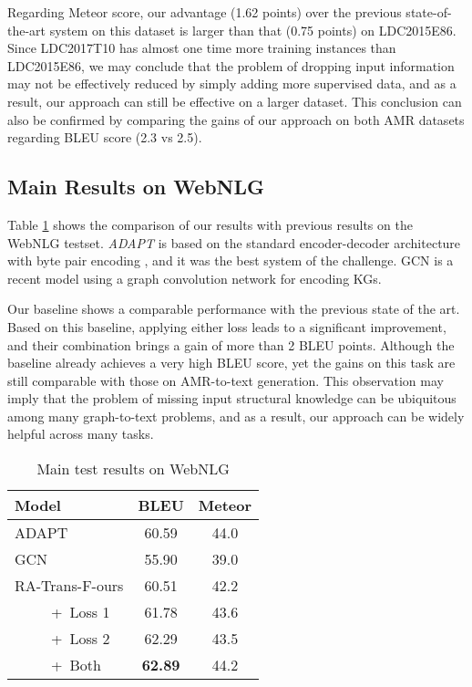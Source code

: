 \documentclass[11pt,a4paper]{article}
\begin{document}
Regarding Meteor score, our advantage (1.62 points) over the previous state-of-the-art system on this dataset is larger than that (0.75 points) on LDC2015E86.
Since LDC2017T10 has almost one time more training instances than LDC2015E86, we may conclude that the problem of dropping input information may not be effectively reduced by simply adding more supervised data, and as a result, our approach can still be effective on a larger dataset.
This conclusion can also be confirmed by comparing the gains of our approach on both AMR datasets regarding BLEU score (2.3 vs 2.5).


\subsection{Main Results on WebNLG}


Table \ref{tab:main_webnlg} shows the comparison of our results with previous results on the WebNLG testset.
\emph{ADAPT} \citep{gardent2017webnlg} is based on the standard encoder-decoder architecture \citep{cho2014learning} with byte pair encoding \citep{sennrich2016neural}, and it was the best system of the challenge.
GCN \citep{marcheggiani2018deep} is a recent model using a graph convolution network \citep{kipf2016semi} for encoding KGs.


Our baseline shows a comparable performance with the previous state of the art.
Based on this baseline, applying either loss leads to a significant improvement, and their combination brings a gain of more than 2 BLEU points.
Although the baseline already achieves a very high BLEU score, yet the gains on this task are still comparable with those on AMR-to-text generation.
This observation may imply that the problem of missing input structural knowledge can be ubiquitous among many graph-to-text problems, and as a result, our approach can be widely helpful across many tasks.


\begin{table}
    \centering
    \begin{tabular}{lcc}
    \toprule
    Model & BLEU & Meteor \\
    \midrule
    ADAPT & 60.59 & 44.0 \\
    GCN & 55.90 & 39.0 \\
    \midrule
    RA-Trans-F-ours & 60.51 & 42.2 \\
    ~~~~~+~Loss 1 & 61.78 & 43.6 \\
    ~~~~~+~Loss 2 & 62.29 & 43.5 \\
    ~~~~~+~Both & \textbf{62.89} & 44.2 \\
    \bottomrule
    \end{tabular}
    \caption{Main test results on WebNLG}
    \label{tab:main_webnlg}
\end{table}
\end{document}
